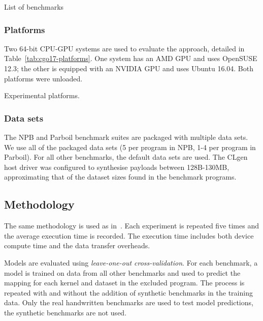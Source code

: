 \begin{table}%
  \centering%
  
  \caption[Benchmarks used in evaluation]{List of benchmarks} %
  \label{tab:cgo17-benchmarks} %
\end{table}

\subsubsection{Platforms} 

Two 64-bit CPU-GPU systems are used to evaluate the approach, detailed in Table~\ref{tab:cgo17-platforms}. One system has an AMD GPU and uses OpenSUSE 12.3; the other is equipped with an NVIDIA GPU and uses Ubuntu 16.04. Both platforms were unloaded.

\begin{table}%
  \centering %
	
  \caption[Experimental platforms used in evaluation]{Experimental platforms.}
  \label{tab:cgo17-platforms}
\end{table}

\subsubsection{Data sets}

The NPB and Parboil benchmark suites are packaged with multiple data sets. We use all of the packaged data sets (5 per program in NPB, 1-4 per program in Parboil). For all other benchmarks, the default data sets are used. The CLgen host driver was configured to synthesise payloads between 128B-130MB, approximating that of the dataset sizes found in the benchmark programs.


\subsection{Methodology}

The same methodology is used as in~\cite{Grewe2013}. Each experiment is repeated five times and the average execution time is recorded. The execution time includes both device compute time and the data transfer overheads.

Models are evaluated using \emph{leave-one-out cross-validation}. For each benchmark, a model is trained on data from all other benchmarks and used to predict the mapping for each kernel and dataset in the excluded program. The process is repeated with and without the addition of synthetic benchmarks in the training data. Only the real handwritten benchmarks are used to test model predictions, the synthetic benchmarks are not used.

